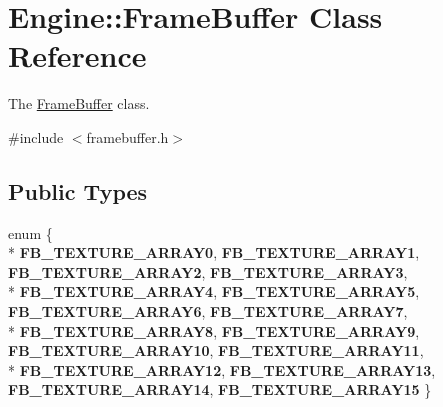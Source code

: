 \hypertarget{classEngine_1_1FrameBuffer}{}\section{Engine\+:\+:Frame\+Buffer Class Reference}
\label{classEngine_1_1FrameBuffer}


The \hyperlink{classEngine_1_1FrameBuffer}{Frame\+Buffer} class.  




{\ttfamily \#include $<$framebuffer.\+h$>$}

\subsection*{Public Types}
\begin{DoxyCompactItemize}
\item 
\hypertarget{classEngine_1_1FrameBuffer_aeb2fbf0213916abf0afbfb31921e7632}{}enum \{ \\*
{\bfseries F\+B\+\_\+\+T\+E\+X\+T\+U\+R\+E\+\_\+\+A\+R\+R\+A\+Y0}, 
{\bfseries F\+B\+\_\+\+T\+E\+X\+T\+U\+R\+E\+\_\+\+A\+R\+R\+A\+Y1}, 
{\bfseries F\+B\+\_\+\+T\+E\+X\+T\+U\+R\+E\+\_\+\+A\+R\+R\+A\+Y2}, 
{\bfseries F\+B\+\_\+\+T\+E\+X\+T\+U\+R\+E\+\_\+\+A\+R\+R\+A\+Y3}, 
\\*
{\bfseries F\+B\+\_\+\+T\+E\+X\+T\+U\+R\+E\+\_\+\+A\+R\+R\+A\+Y4}, 
{\bfseries F\+B\+\_\+\+T\+E\+X\+T\+U\+R\+E\+\_\+\+A\+R\+R\+A\+Y5}, 
{\bfseries F\+B\+\_\+\+T\+E\+X\+T\+U\+R\+E\+\_\+\+A\+R\+R\+A\+Y6}, 
{\bfseries F\+B\+\_\+\+T\+E\+X\+T\+U\+R\+E\+\_\+\+A\+R\+R\+A\+Y7}, 
\\*
{\bfseries F\+B\+\_\+\+T\+E\+X\+T\+U\+R\+E\+\_\+\+A\+R\+R\+A\+Y8}, 
{\bfseries F\+B\+\_\+\+T\+E\+X\+T\+U\+R\+E\+\_\+\+A\+R\+R\+A\+Y9}, 
{\bfseries F\+B\+\_\+\+T\+E\+X\+T\+U\+R\+E\+\_\+\+A\+R\+R\+A\+Y10}, 
{\bfseries F\+B\+\_\+\+T\+E\+X\+T\+U\+R\+E\+\_\+\+A\+R\+R\+A\+Y11}, 
\\*
{\bfseries F\+B\+\_\+\+T\+E\+X\+T\+U\+R\+E\+\_\+\+A\+R\+R\+A\+Y12}, 
{\bfseries F\+B\+\_\+\+T\+E\+X\+T\+U\+R\+E\+\_\+\+A\+R\+R\+A\+Y13}, 
{\bfseries F\+B\+\_\+\+T\+E\+X\+T\+U\+R\+E\+\_\+\+A\+R\+R\+A\+Y14}, 
{\bfseries F\+B\+\_\+\+T\+E\+X\+T\+U\+R\+E\+\_\+\+A\+R\+R\+A\+Y15}
 \}\label{classEngine_1_1FrameBuffer_aeb2fbf0213916abf0afbfb31921e7632}

\end{DoxyCompactItemize}
